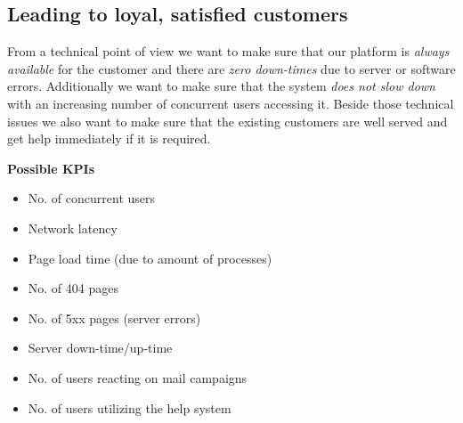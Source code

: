 
\subsection{Leading to loyal, satisfied customers}
From a technical point of view we want to make sure that our platform is \textit{always available} for the customer and there are \textit{zero down-times} due to server or software errors. Additionally we want to make sure that the system \textit{does not slow down} with an increasing number of concurrent users accessing it. Beside those technical issues we also want to make sure that the existing customers are well served and get help immediately if it is required.

\begin{description}
	\item \textbf{Possible KPIs}
	\begin{itemize}
    	\item No. of concurrent users
    	\item Network latency
        \item Page load time (due to amount of processes)
        \item No. of 404 pages
        \item No. of 5xx pages (server errors)
        \item Server down-time/up-time
        \item No. of users reacting on mail campaigns
        \item No. of users utilizing the help system
    \end{itemize}
\end{description}

